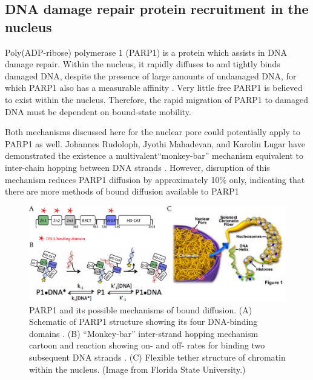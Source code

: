 \subsection{DNA damage repair protein recruitment in the nucleus}
\label{sec:parp1}
Poly(ADP-ribose) polymerase 1 (PARP1) is a protein  which assists in DNA damage repair.  Within the nucleus, it rapidly diffuses to and tightly binds damaged DNA, despite the presence of large amounts of undamaged DNA, for which PARP1 also has a measurable affinity \cite{rudolph18,sukhanova16}.  Very little free PARP1 is believed to exist within the nucleus.  Therefore, the rapid migration of PARP1 to damaged DNA must be dependent on bound-state mobility.

Both mechanisms discussed here for the nuclear pore could potentially apply to PARP1 as well.  Johannes Rudoloph, Jyothi Mahadevan, and Karolin Lugar have demonstrated the existence a multivalent``monkey-bar'' mechanism equivalent to inter-chain hopping between DNA strands \cite{rudolph18}.  However, disruption of this mechanism reduces PARP1 diffusion by approximately 10\% only, indicating that there are more methods of bound diffusion available to PARP1 \cite{mahadevan18}

\begin{figure}
\centering
\includegraphics[width=\linewidth]{figs/ch02/PARP1.pdf}
\caption[Possible bound-diffusion mechanisms of PARP1.]{PARP1 and its possible mechanisms of bound diffusion. (A) Schematic of PARP1 structure showing its four DNA-binding domains \cite{rudolph18}. (B) ``Monkey-bar'' inter-strand hopping mechanism cartoon and reaction showing on- and off- rates for binding two subsequent DNA strands \cite{rudolph18}.  (C) Flexible tether structure of chromatin within the nucleus.  (Image from Florida State University.)}
\label{fig:parp1}
\end{figure}

